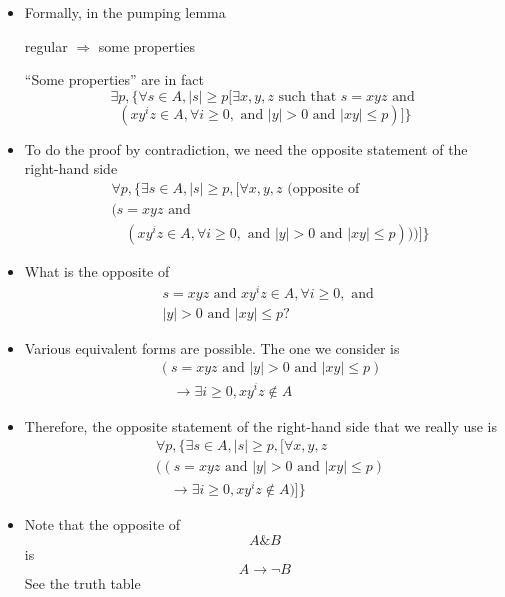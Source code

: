 \begin{frame}[allowframebreaks]
\begin{itemize}
  \item Formally, in the pumping lemma
      \begin{center}
regular $\Rightarrow$ some properties    
  \end{center}
  ``Some properties'' are in fact
  \begin{equation*}
\exists p, \{\forall s \in A, |s|\geq p [ 
\exists x,y,z \text{ such that } s = xyz \text{ and }
\end{equation*}
\begin{equation*}
(xy^iz\in A, \forall i \geq 0,
\mbox{ and }
|y| > 0
\mbox{ and }
|xy|
\leq p)]\}
\end{equation*}
\item To do the proof by contradiction, we need the opposite statement of the right-hand side
\begin{equation*}
  \begin{split}
& \forall p, \{\exists s \in A, |s|\geq p, 
[\forall x,y,z \text{ (opposite of } \\
& (s = xyz \text{ and } \\  
& \quad (xy^iz\in A, \forall i \geq 0,
\mbox{ and }
|y| > 0
\mbox{ and }
|xy|
\leq p)))]\}
\end{split}
\end{equation*}
\item What is the opposite of
\begin{equation*}
  \begin{split}
& s = xyz \text{ and }
xy^iz\in A, \forall i \geq 0,
\mbox{ and } \\
& |y| > 0
\mbox{ and }
|xy|
\leq p?
\end{split}
\end{equation*}
\item Various equivalent forms are possible. The one we consider is
  \begin{equation*}
    \begin{split}
      & 
(s = xyz
\text{ and }
|y| > 0
 \mbox{ and }
 |xy|
 \leq p
)
\\
& \quad \rightarrow
\exists i \geq 0, xy^iz\notin A
    \end{split}
  \end{equation*}
\item Therefore, the
  opposite statement of the right-hand side that we really use is
 \begin{equation}
   \begin{split}
& \forall p, \{\exists s \in A, |s|\geq p, 
[\forall x,y,z 
\\
& (
(s = xyz
\text{ and }
|y| > 0
 \mbox{ and }
 |xy|
 \leq p
)
\\
& \quad \rightarrow
\exists i \geq 0, xy^iz\notin A)]\} 
\end{split}
\label{eq:oppositepumping}
 \end{equation}
\item Note that the opposite of
  \begin{equation*}
    A \& B
  \end{equation*}
is
\begin{equation*}
  A \rightarrow \neg B
\end{equation*}
See the truth table


\end{itemize}
\end{frame}
